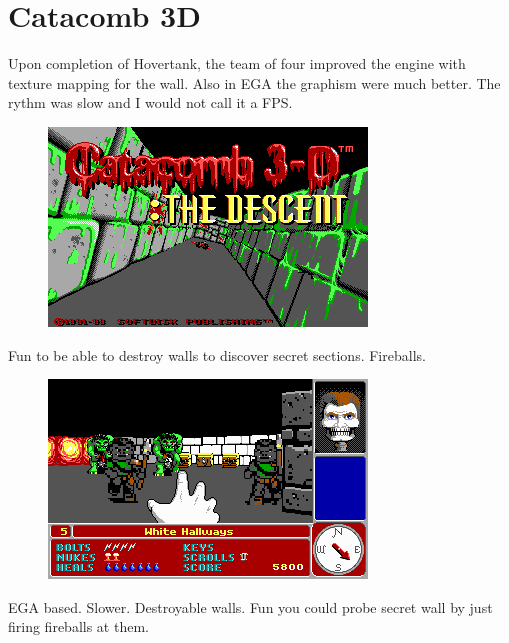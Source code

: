 \section{Catacomb 3D}
Upon completion of Hovertank, the team of four improved the engine with texture mapping for the wall. Also in EGA the graphism were much better. The rythm was slow and I would not call it a FPS. 
\begin{figure}[H]
\centering
\includegraphics[width=\textwidth]{screenshots/Catacomb_3-D_The_Descent_title_screen.png}
\end{figure}

Fun to be able to destroy walls to discover secret sections. Fireballs.

\begin{figure}[H]
\centering
\includegraphics[width=\textwidth]{screenshots/Catacomb_3-D_The_Descent_screenshot.png}
\end{figure}

EGA based. Slower. Destroyable walls. Fun you could probe secret wall by just firing fireballs at them.



